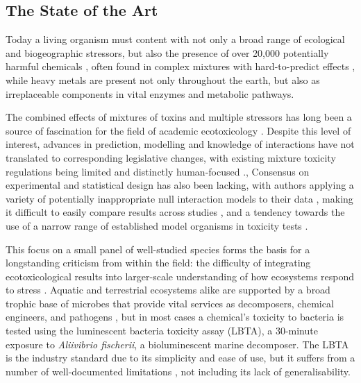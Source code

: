 \documentclass[review,12pt]{elsarticle}
\begin{document}
\subsection{The State of the Art}

Today a living organism must content with not only a broad range of ecological and biogeographic stressors, but also the presence of over 20,000 potentially harmful chemicals \cite{ECHA2018a}, often found in complex mixtures with hard-to-predict effects \cite{EuropeanCommission2012a}, while heavy metals are present not only throughout the earth, but also as irreplaceable components in vital enzymes and metabolic pathways.

The combined effects of mixtures of toxins and multiple stressors has long been a source of fascination for the field of academic ecotoxicology \cite{Bliss1939}. Despite this level of interest, advances in prediction, modelling and knowledge of interactions \cite{Lkke2013ToolsStressors,Cote2016,Jackson2016} have not translated to corresponding legislative changes, with existing mixture toxicity regulations being limited and distinctly human-focused \cite{EuropeanCommission2012a}., Consensus on experimental and statistical design has also been lacking, with authors applying a variety of potentially inappropriate null interaction models to their data \cite{Piggott2015,Schafer2018}, making it difficult to easily compare results across studies \cite{Jackson2016},  and a tendency towards the use of a narrow range of established model organisms in toxicity tests \cite{OECD2014SectionSystems}.

This focus on a small panel of well-studied species forms the basis for a longstanding criticism from within the field: the difficulty of integrating ecotoxicological results into larger-scale understanding of how ecosystems respond to stress \cite{Chapman2002a,Gessner2016}. Aquatic and terrestrial ecosystems alike are supported by a broad trophic base of microbes that provide vital services as decomposers, chemical engineers, and pathogens \cite{Nannipieri2003a,VanderHeijden2008a}, but in most cases a chemical’s toxicity to bacteria is tested using the luminescent bacteria toxicity assay (LBTA), a 30-minute exposure to \textit{Aliivibrio fischerii}, a bioluminescent marine decomposer. The LBTA is the industry standard due to its simplicity and ease of use, but it suffers from a number of well-documented limitations \cite{Ma2014}, not including its lack of generalisability. 
\end{document}
